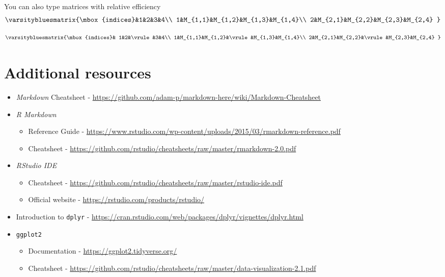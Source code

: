 \documentclass{article}
\providecommand{\tightlist}{\setlength{\itemsep}{0pt}\setlength{\parskip}{0pt}}
\begin{document}
You can also type matrices with relative efficiency \[
\varsitybluesmatrix{\mbox{indices}&1&2&3&4\\
1&M_{1,1}&M_{1,2}&M_{1,3}&M_{1,4}\\
2&M_{2,1}&M_{2,2}&M_{2,3}&M_{2,4}
}
\]

\[
\varsitybluesmatrix{\mbox{indices}&
1&2&\vrule&3&4\\
1&M_{1,1}&M_{1,2}&\vrule&M_{1,3}&M_{1,4}\\
2&M_{2,1}&M_{2,2}&\vrule&M_{2,3}&M_{2,4}
}
\]

\hypertarget{additional-resources}{%
\section{Additional resources}\label{additional-resources}}

\begin{itemize}
\item
  \emph{Markdown} Cheatsheet -
  \url{https://github.com/adam-p/markdown-here/wiki/Markdown-Cheatsheet}
\item
  \emph{R Markdown}

  \begin{itemize}
  \tightlist
  \item
    Reference Guide -
    \url{https://www.rstudio.com/wp-content/uploads/2015/03/rmarkdown-reference.pdf}
  \item
    Cheatsheet -
    \url{https://github.com/rstudio/cheatsheets/raw/master/rmarkdown-2.0.pdf}
  \end{itemize}
\item
  \emph{RStudio IDE}

  \begin{itemize}
  \tightlist
  \item
    Cheatsheet -
    \url{https://github.com/rstudio/cheatsheets/raw/master/rstudio-ide.pdf}
  \item
    Official website - \url{https://rstudio.com/products/rstudio/}
  \end{itemize}
\item
  Introduction to \texttt{dplyr} -
  \url{https://cran.rstudio.com/web/packages/dplyr/vignettes/dplyr.html}
\item
  \texttt{ggplot2}

  \begin{itemize}
  \tightlist
  \item
    Documentation - \url{https://ggplot2.tidyverse.org/}
  \item
    Cheatsheet -
    \url{https://github.com/rstudio/cheatsheets/raw/master/data-visualization-2.1.pdf}
  \end{itemize}
\end{itemize}
\end{document}
